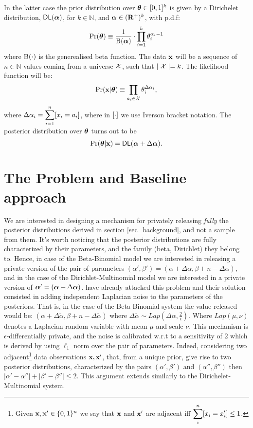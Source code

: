 \documentclass[sigconf, anonymous]{acmart}
\begin{document}
In the latter case the prior distribution over $\boldsymbol{\theta}\in [0,1]^{k}$ is given by a Dirichelet distribution, $\mathsf{DL}(\boldsymbol{\alpha})$, for $k\in\mathbb{N}$,
and $\boldsymbol{\alpha}\in(\mathbf{R^{+}})^{k}$, with p.d.f:
\[
  \Pr(\boldsymbol{\theta})\equiv\frac{1}{\boldsymbol{\textup{B}}(\boldsymbol{\alpha})}\cdot \displaystyle\prod_{i=1}^{k}{\theta_i^{\alpha_i-1}}
\]
where $\boldsymbol{\textup{B}}(\cdot)$ is the generealised beta function.
The data $\textbf{x}$ will be a sequence of $n\in\mathbb{N}$ values coming from a universe $\mathcal{X}$, such that $\mid\mathcal{X} \mid=k$.
The likelihood function will be:
\[
  \Pr(\textbf{x}|\boldsymbol{\theta})\equiv \displaystyle\prod_{a_i\in\mathcal{X}}\theta_{i}^{\Delta \alpha_i},
\]
where $\Delta \alpha_i=\displaystyle\sum_{i=1}^{n}[x_i=a_i]$, where in $[\cdot]$ we use
Iverson bracket notation. The posterior distribution over $\boldsymbol{\theta}$ turns out to be
\[
  \Pr(\boldsymbol{\theta}|\textbf{x})=\mathsf{DL}(\boldsymbol{\alpha}+\Delta \boldsymbol{\alpha}).
\]


\section{The Problem and Baseline approach}
We are interested in designing a mechanism for privately releasing
\emph{fully} the posterior distributions derived in section \ref{sec_background},
and not a sample from them.  It's worth noticing that the posterior
distributions are fully characterized by their parameters, and the
family (beta, Dirichlet) they belong to.  Hence, in case of the
Beta-Binomial model we are interested in releasing a private version
of the pair of parameters $(\alpha',\beta')=(\alpha + \Delta \alpha,\beta + n - \Delta \alpha)$, and
in the case of the Dirichlet-Multinomial model we are interested in a
private version of $\boldsymbol{\alpha}'=(\boldsymbol{\alpha} + \Delta \boldsymbol{\alpha})$.  have
already attacked this problem and their solution consisted in adding
independent Laplacian noise to the parameters of the posteriors. That
is, in the case of the Beta-Binomial system the value released would
be: $(\alpha + \Delta \tilde\alpha,\beta + n - \Delta \tilde\alpha)$ where $\Delta \tilde\alpha\sim Lap(\Delta \alpha, \frac{2}{\epsilon})$.
Where $Lap(\mu,\nu)$
denotes a Laplacian random variable with mean $\mu$ and scale $\nu$.
This mechanism is $\epsilon$-differentially private, and the noise is
calibrated w.r.t to a sensitivity of 2 which is derived by using
$\ell_1$ norm over the pair of parameters. Indeed, considering two
adjacent\footnote{Given $\textbf{x}, \textbf{x}'\in\{0,1\}^{n}$ we say that $\textbf{x}$ and $\textbf{x}'$ are adjacent iff
$\displaystyle \sum_{i}^{n}[x_i = x'_i ]\leq 1$.} data observations
$\textbf{x}, \textbf{x}'$, that, from a unique prior, give rise to two posterior
distributions, characterized by the pairs
$(\alpha',\beta')$ and $(\alpha'',\beta'')$ then
$|\alpha'-\alpha''|+|\beta'-\beta''|\leq 2$.
This argument extends similarly to the Dirichelet-Multinomial system.
\end{document}

